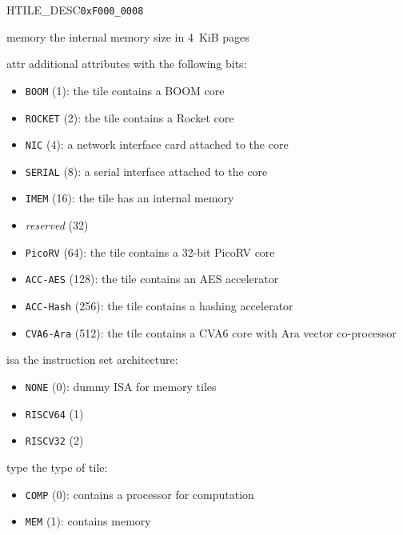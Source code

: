 \begin{register}{H}{TILE\_DESC}{\texttt{0xF000\_0008}}
  \regnewline%
  \begin{regdesc}\begin{reglist}
    \item[memory] the internal memory size in 4~KiB pages
    \item[attr] additional attributes with the following bits:
    \begin{itemize}
      \item \texttt{BOOM} (1): the tile contains a BOOM core
      \item \texttt{ROCKET} (2): the tile contains a Rocket core
      \item \texttt{NIC} (4): a network interface card attached to the core
      \item \texttt{SERIAL} (8): a serial interface attached to the core
      \item \texttt{IMEM} (16): the tile has an internal memory
      \item \textit{reserved} (32)
      \item \texttt{PicoRV} (64): the tile contains a 32-bit PicoRV core
      \item \texttt{ACC-AES} (128): the tile contains an AES accelerator
      \item \texttt{ACC-Hash} (256): the tile contains a hashing accelerator
      \item \texttt{CVA6-Ara} (512): the tile contains a CVA6 core with Ara vector co-processor
    \end{itemize}
    \item[isa] the instruction set architecture:
    \begin{itemize}
      \item \texttt{NONE} (0): dummy ISA for memory tiles
      \item \texttt{RISCV64} (1)
      \item \texttt{RISCV32} (2)
    \end{itemize}
    \item[type] the type of tile:
    \begin{itemize}
      \item \texttt{COMP} (0): contains a processor for computation
      \item \texttt{MEM} (1): contains memory
    \end{itemize}
  \end{reglist}\end{regdesc}
\end{register}

